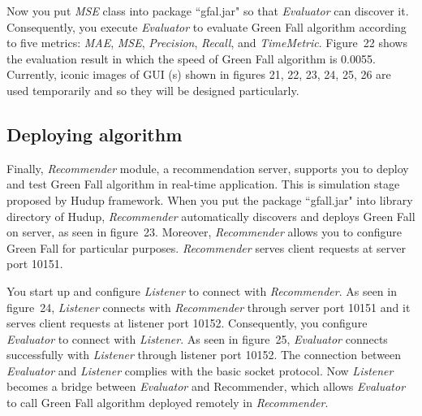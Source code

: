 \documentclass[a4paper]{llncs}
\begin{document}
Now you put \textit{MSE} class into package ``gfal.jar" so that \textit{Evaluator} can discover it. Consequently, you execute \textit{Evaluator} to evaluate Green Fall algorithm according to five metrics: \textit{MAE}, \textit{MSE}, \textit{Precision}, \textit{Recall}, and \textit{TimeMetric}. Figure~22 shows the evaluation result in which the speed of Green Fall algorithm is 0.0055. Currently, iconic images of GUI (s) shown in figures 21, 22, 23, 24, 25, 26 are used temporarily and so they will be designed particularly.

\subsection{Deploying algorithm}
\label{subsec:tutorial-deploying}
Finally, \textit{Recommender} module, a recommendation server, supports you to deploy and test Green Fall algorithm in real-time application. This is simulation stage proposed by Hudup framework. When you put the package ``gfall.jar" into library directory of Hudup, \textit{Recommender} automatically discovers and deploys Green Fall on server, as seen in figure~23. Moreover, \textit{Recommender} allows you to configure Green Fall for particular purposes. \textit{Recommender} serves client requests at server port 10151.

You start up and configure \textit{Listener} to connect with \textit{Recommender}. As seen in figure~24, \textit{Listener} connects with \textit{Recommender} through server port 10151 and it serves client requests at listener port 10152.
Consequently, you configure \textit{Evaluator} to connect with \textit{Listener}. As seen in figure~25, \textit{Evaluator} connects successfully with \textit{Listener} through listener port 10152. The connection between \textit{Evaluator} and \textit{Listener} complies with the basic socket protocol. Now \textit{Listener} becomes a bridge between \textit{Evaluator} and Recommender, which allows \textit{Evaluator} to call Green Fall algorithm deployed remotely in \textit{Recommender}.
\end{document}

